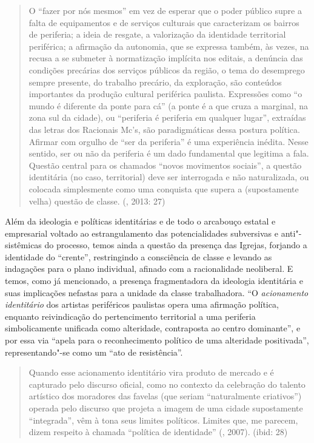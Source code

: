 \begin{quote}
O ``fazer por nós mesmos'' em vez de esperar que o poder público supre a
falta de equipamentos e de serviços culturais que caracterizam os
bairros de periferia; a ideia de resgate, a valorização da identidade
territorial periférica; a afirmação da autonomia, que se expressa
também, às vezes, na recusa a se submeter à normatização implícita nos
editais, a denúncia das condições precárias dos serviços públicos da
região, o tema do desemprego sempre presente, do trabalho precário, da
exploração, são conteúdos importantes da produção cultural periférica
paulista. Expressões como ``o mundo é diferente da ponte para cá'' (a
ponte é a que cruza a marginal, na zona sul da cidade), ou ``periferia é
periferia em qualquer lugar'', extraídas das letras dos Racionais Mc's,
são paradigmáticas dessa postura política. Afirmar com orgulho de ``ser
da periferia'' é uma experiência inédita. Nesse sentido, ser ou não da
periferia é um dado fundamental que legitima a fala. Questão central
para os chamados ``novos movimentos sociais'', a questão identitária (no
caso, territorial) deve ser interrogada e não naturalizada, ou colocada
simplesmente como uma conquista que supera a (supostamente velha)
questão de classe. (, 2013: 27)
\end{quote}

Além da ideologia e políticas identitárias e de todo o arcabouço estatal
e empresarial voltado ao estrangulamento das potencialidades subversivas
e anti"-sistêmicas do processo, temos ainda a questão da presença das
Igrejas, forjando a identidade do ``crente'', restringindo a consciência
de classe e levando as indagações para o plano individual, afinado com a
racionalidade neoliberal. E temos, como já mencionado, a presença
fragmentadora da ideologia identitária e suas implicações nefastas para
a unidade da classe trabalhadora. ``O \emph{acionamento identitário}
dos artistas periféricos paulistas opera uma afirmação política,
enquanto reivindicação do pertencimento territorial a uma periferia
simbolicamente unificada como alteridade, contraposta ao centro
dominante'', e por essa via ``apela para o reconhecimento político de
uma alteridade positivada'', representando"-se como um ``ato de
resistência''.

\begin{quote}
Quando esse acionamento identitário vira produto de mercado e é
capturado pelo discurso oficial, como no contexto da celebração do
talento artístico dos moradores das favelas (que seriam ``naturalmente
criativos'') operada pelo discurso que projeta a imagem de uma cidade
supostamente ``integrada'', vêm à tona seus limites políticos. Limites
que, me parecem, dizem respeito à chamada ``política de identidade''
(, 2007). (ibid: 28)
\end{quote}

